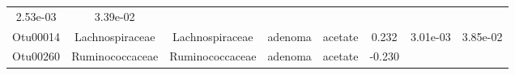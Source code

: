 \documentclass[11pt,]{article}
\begin{document}
\begin{longtable}[]{@{}cccccccc@{}}
\begin{minipage}[t]{0.08\columnwidth}
2.53e-03\strut
\end{minipage} & \begin{minipage}[t]{0.08\columnwidth}\centering\strut
3.39e-02\strut
\end{minipage}\tabularnewline
\begin{minipage}[t]{0.08\columnwidth}\centering\strut
Otu00014\strut
\end{minipage} & \begin{minipage}[t]{0.15\columnwidth}\centering\strut
Lachnospiraceae\strut
\end{minipage} & \begin{minipage}[t]{0.15\columnwidth}\centering\strut
Lachnospiraceae\strut
\end{minipage} & \begin{minipage}[t]{0.08\columnwidth}\centering\strut
adenoma\strut
\end{minipage} & \begin{minipage}[t]{0.09\columnwidth}\centering\strut
acetate\strut
\end{minipage} & \begin{minipage}[t]{0.07\columnwidth}\centering\strut
0.232\strut
\end{minipage} & \begin{minipage}[t]{0.08\columnwidth}\centering\strut
3.01e-03\strut
\end{minipage} & \begin{minipage}[t]{0.08\columnwidth}\centering\strut
3.85e-02\strut
\end{minipage}\tabularnewline
\begin{minipage}[t]{0.08\columnwidth}\centering\strut
Otu00260\strut
\end{minipage} & \begin{minipage}[t]{0.15\columnwidth}\centering\strut
Ruminococcaceae\strut
\end{minipage} & \begin{minipage}[t]{0.15\columnwidth}\centering\strut
Ruminococcaceae\strut
\end{minipage} & \begin{minipage}[t]{0.08\columnwidth}\centering\strut
adenoma\strut
\end{minipage} & \begin{minipage}[t]{0.09\columnwidth}\centering\strut
acetate\strut
\end{minipage} & \begin{minipage}[t]{0.07\columnwidth}\centering\strut
-0.230\strut
\end{minipage} & \begin{minipage}[t]{0.08\columnwidth}\centering\strut

\end{minipage}
\end{longtable}
\end{document}

